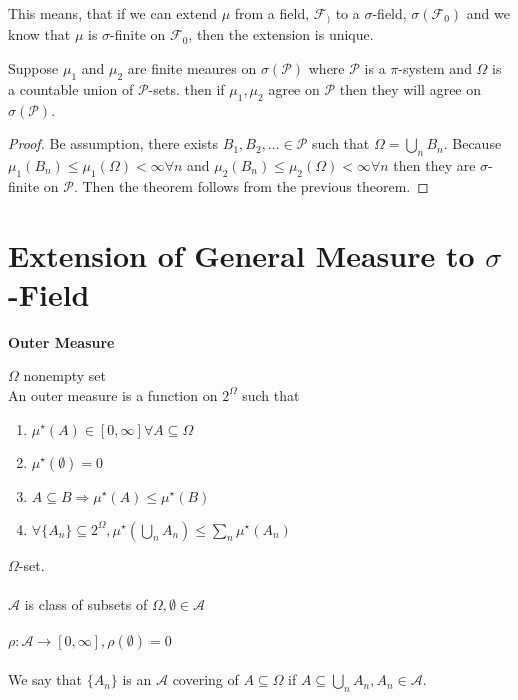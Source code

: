 \documentclass[11pt,fleqn]{book} %
\begin{document}
	This means, that if we can extend $\mu$ from a field, $\mathcal{F}_)$ to a $\sigma$-field, $\sigma(\mathcal{F}_0)$ and we know that $\mu $ is $\sigma$-finite on $\mathcal{F}_0$, then the extension is unique. \\

	\begin{theorem}
		Suppose $\mu_1$ and $\mu_2$ are finite meaures on $\sigma(\mathcal{P})$ where $\mathcal{P}$ is a $\pi$-system and $\Omega$ is a countable union of $\mathcal{P}$-sets. then if $\mu_1, \mu_2$ agree on $\mathcal{P}$ then they will agree on $\sigma(\mathcal{P})$. 
	\end{theorem}

	\begin{proof}
		Be assumption, there exists $B_1, B_2, \dots \in \mathcal{P}$ such that $\Omega = \bigcup_n B_n$. Because $\mu_1(B_n) \leq \mu_1 (\Omega) < \infty \forall n$ and $\mu_2(B_n) \leq \mu_2 (\Omega) < \infty \forall n$ then they are $\sigma$-finite on $\mathcal{P}.$ Then the theorem follows from the previous theorem. 
	\end{proof}


\section{Extension of General Measure to $\sigma$-Field}

\textbf{Outer Measure}\\

	\begin{definition}
		$\Omega$ nonempty set\\

		An outer measure is a function on $2^\Omega$ such that
			\begin{enumerate}
				\item $\mu^\star(A) \in [0,\infty] \forall A \subseteq \Omega$ 
				\item $\mu^\star(\emptyset) = 0$
				\item $A\subseteq B \Rightarrow \mu^\star(A) \leq \mu^\star(B)$
				\item $\forall \{A_n\} \subseteq 2^\Omega, \mu^\star (\bigcup_n A_n) \leq \displaystyle \sum_n \mu^\star (A_n)$
			\end{enumerate}
	\end{definition}

\begin{example}[11.1 in Billingsly]
	$\Omega$-set.\\
	\\
	$\mathcal{A}$ is class of subsets of $\Omega, \emptyset \in \mathcal{A}$\\
	\\

	$\rho: \mathcal{A} \rightarrow [0, \infty], \rho(\emptyset)= 0$\\
	\\

	We say that $\{A_n\}$ is an $\mathcal{A}$ covering of $A \subseteq \Omega$ if $A \subseteq \bigcup_n A_n, A_n \in \mathcal{A}$. 


\end{example}
\end{document}
